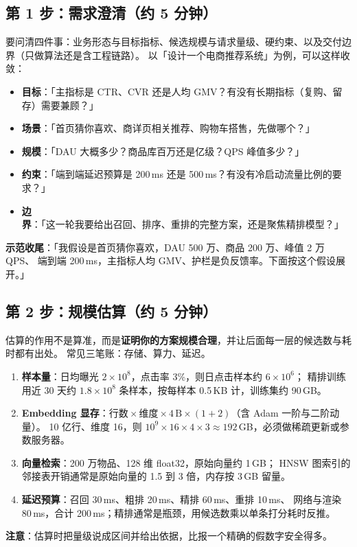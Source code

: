 \subsection{第 1 步：需求澄清（约 5 分钟）}

要问清四件事：业务形态与目标指标、候选规模与请求量级、硬约束、以及交付边界（只做算法还是含工程链路）。
以「设计一个电商推荐系统」为例，可以这样收敛：

\begin{interview}[澄清清单与示范问法]
\begin{itemize}
  \item \textbf{目标}：「主指标是 CTR、CVR 还是人均 GMV？有没有长期指标（复购、留存）需要兼顾？」
  \item \textbf{场景}：「首页猜你喜欢、商详页相关推荐、购物车搭售，先做哪个？」
  \item \textbf{规模}：「DAU 大概多少？商品库百万还是亿级？QPS 峰值多少？」
  \item \textbf{约束}：「端到端延迟预算是 200\,ms 还是 500\,ms？有没有冷启动流量比例的要求？」
  \item \textbf{边界}：「这一轮我要给出召回、排序、重排的完整方案，还是聚焦精排模型？」
\end{itemize}
\textbf{示范收尾}：「我假设是首页猜你喜欢，DAU 500 万、商品 200 万、峰值 2 万 QPS、
端到端 200\,ms，主指标人均 GMV、护栏是负反馈率。下面按这个假设展开。」
\end{interview}

\subsection{第 2 步：规模估算（约 5 分钟）}

估算的作用不是算准，而是\textbf{证明你的方案规模合理}，并让后面每一层的候选数与耗时都有出处。
常见三笔账：存储、算力、延迟。

\begin{interview}[三类规模估算的标准算法]
\begin{enumerate}
  \item \textbf{样本量}：日均曝光 $2\times 10^8$，点击率 3\%，则日点击样本约 $6\times 10^6$；
        精排训练用近 30 天约 $1.8\times 10^8$ 条样本，按每样本 0.5\,KB 计，训练集约 90\,GB。
  \item \textbf{Embedding 显存}：$\text{行数}\times\text{维度}\times 4\,\text{B}\times(1+2)$（含 Adam 一阶与二阶动量）。
        10 亿行、维度 16，则 $10^9\times 16\times 4\times 3 \approx 192$\,GB，必须做稀疏更新或参数服务器。
  \item \textbf{向量检索}：200 万物品、128 维 float32，原始向量约 1\,GB；
        HNSW 图索引的邻接表开销通常是原始向量的 1.5 到 3 倍，内存按 3\,GB 留量。
  \item \textbf{延迟预算}：召回 30\,ms、粗排 20\,ms、精排 60\,ms、重排 10\,ms、
        网络与渲染 80\,ms，合计 200\,ms；精排通常是瓶颈，用候选数乘以单条打分耗时反推。
\end{enumerate}
\textbf{注意}：估算时把量级说成区间并给出依据，比报一个精确的假数字安全得多。
\end{interview}

